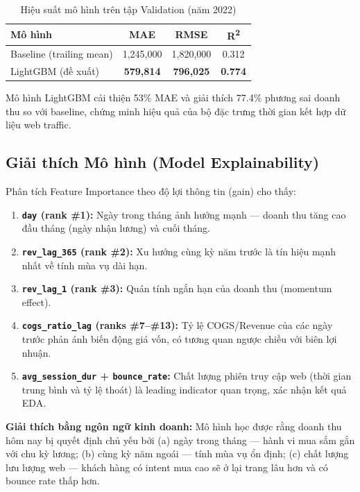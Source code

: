 \documentclass{article}
\begin{document}
\begin{table}[h]
  \caption{Hiệu suất mô hình trên tập Validation (năm 2022)}
  \label{tab:results}
  \centering
  \begin{tabular}{lccc}
    \toprule
    \textbf{Mô hình} & \textbf{MAE} & \textbf{RMSE} & \textbf{R\textsuperscript{2}} \\
    \midrule
    Baseline (trailing mean) & 1,245,000 & 1,820,000 & 0.312 \\
    LightGBM (đề xuất)       & \textbf{579,814} & \textbf{796,025} & \textbf{0.774} \\
    \bottomrule
  \end{tabular}
\end{table}

Mô hình LightGBM cải thiện 53\% MAE và giải thích 77.4\% phương sai doanh thu so với baseline, chứng minh hiệu quả của bộ đặc trưng thời gian kết hợp dữ liệu web traffic.

\subsection{Giải thích Mô hình (Model Explainability)}

Phân tích Feature Importance theo độ lợi thông tin (gain) cho thấy:
\begin{enumerate}[noitemsep]
    \item \textbf{\texttt{day} (rank \#1):} Ngày trong tháng ảnh hưởng mạnh — doanh thu tăng cao đầu tháng (ngày nhận lương) và cuối tháng.
    \item \textbf{\texttt{rev\_lag\_365} (rank \#2):} Xu hướng cùng kỳ năm trước là tín hiệu mạnh nhất về tính mùa vụ dài hạn.
    \item \textbf{\texttt{rev\_lag\_1} (rank \#3):} Quán tính ngắn hạn của doanh thu (momentum effect).
    \item \textbf{\texttt{cogs\_ratio\_lag} (ranks \#7--\#13):} Tỷ lệ COGS/Revenue của các ngày trước phản ánh biến động giá vốn, có tương quan ngược chiều với biên lợi nhuận.
    \item \textbf{\texttt{avg\_session\_dur} + \texttt{bounce\_rate}:} Chất lượng phiên truy cập web (thời gian trung bình và tỷ lệ thoát) là leading indicator quan trọng, xác nhận kết quả EDA.
\end{enumerate}

\textbf{Giải thích bằng ngôn ngữ kinh doanh:} Mô hình học được rằng doanh thu hôm nay bị quyết định chủ yếu bởi (a) ngày trong tháng — hành vi mua sắm gắn với chu kỳ lương; (b) cùng kỳ năm ngoái — tính mùa vụ ổn định; (c) chất lượng lưu lượng web — khách hàng có intent mua cao sẽ ở lại trang lâu hơn và có bounce rate thấp hơn.
\end{document}
